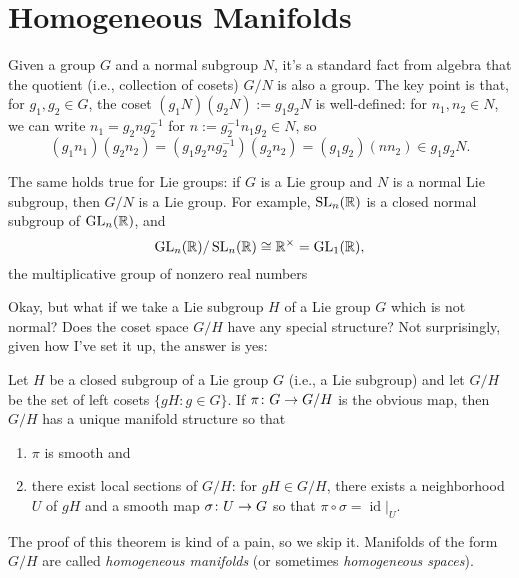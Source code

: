 
\section{Homogeneous Manifolds}
\label{sec:homogeneous manifolds}

Given a group $G$ and a normal subgroup $N$, it's a standard fact from algebra that the quotient (i.e., collection of cosets) $G/N$ is also a group. The key point is that, for $g_1, g_2 \in G$, the coset $(g_1 N) (g_2 N) := g_1 g_2 N$ is well-defined: for $n_1,n_2 \in N$, we can write $n_1 = g_2 n g_2^{-1}$ for  $n := g_2^{-1} n_1 g_2 \in N$, so
\[
	(g_1 n_1) (g_2 n_2) = (g_1 g_2 n g_2^{-1}) (g_2 n_2) = (g_1 g_2) (n n_2) \in g_1 g_2 N.
\]

The same holds true for Lie groups: if $G$ is a Lie group and $N$ is a normal Lie subgroup, then $G/N$ is a Lie group. For example, $\operatorname{SL}_n(\mathbb{R})$ is a closed normal subgroup of $\operatorname{GL}_n(\mathbb{R})$, and 
\[
	\operatorname{GL}_n(\mathbb{R}) / \operatorname{SL}_n(\mathbb{R}) \cong \mathbb{R}^\times = \operatorname{GL}_1(\mathbb{R}),
\]
the multiplicative group of nonzero real numbers

Okay, but what if we take a Lie subgroup $H$ of a Lie group $G$ which is not normal? Does the coset space $G/H$ have any special structure? Not surprisingly, given how I've set it up, the answer is yes:

\begin{theorem}\label{thm:homogeneous space}
	Let $H$ be a closed subgroup of a Lie group $G$ (i.e., a Lie subgroup) and let $G/H$ be the set of left cosets $\{gH : g \in G\}$. If $\pi \colon\thinspace\! G \to G/H$ is the obvious map, then $G/H$ has a unique manifold structure so that
	\begin{enumerate}
		\item $\pi$ is smooth and
		\item there exist local sections of $G/H$: for $gH \in G/H$, there exists a neighborhood $U$ of $gH$ and a smooth map $\sigma \colon\thinspace\! U \to G$ so that $\pi \circ \sigma = \operatorname{id}|_U$.
	\end{enumerate}
\end{theorem}

The proof of this theorem is kind of a pain, so we skip it. Manifolds of the form $G/H$ are called \emph{homogeneous manifolds} (or sometimes \emph{homogeneous spaces}).

